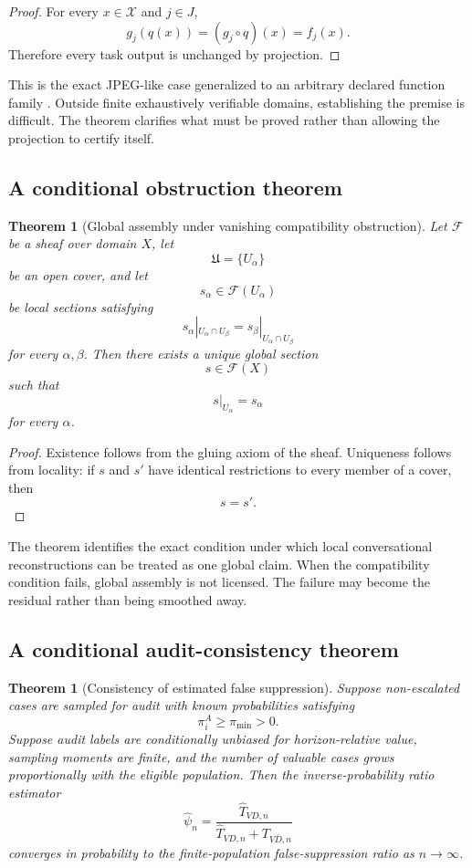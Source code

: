 \documentclass[11pt]{article}
\newtheorem{theorem}[definition]{Theorem}
\theoremstyle{definition}
\begin{document}
\begin{proof}
For every \(x\in\mathcal{X}\) and \(j\in J\),
\[
g_j(q(x))
=
(g_j\circ q)(x)
=
f_j(x).
\]
Therefore every task output is unchanged by projection.
\end{proof}

This is the exact JPEG-like case generalized to an arbitrary declared function family \cite{mitchell2002}. Outside finite exhaustively verifiable domains, establishing the premise is difficult. The theorem clarifies what must be proved rather than allowing the projection to certify itself.

\subsection{A conditional obstruction theorem}

\begin{theorem}[Global assembly under vanishing compatibility obstruction]
Let \(\mathcal{F}\) be a sheaf over domain \(X\), let
\[
\mathfrak{U}=\{U_\alpha\}
\]
be an open cover, and let
\[
s_\alpha\in\mathcal{F}(U_\alpha)
\]
be local sections satisfying
\[
s_\alpha|_{U_\alpha\cap U_\beta}
=
s_\beta|_{U_\alpha\cap U_\beta}
\]
for every \(\alpha,\beta\). Then there exists a unique global section
\[
s\in\mathcal{F}(X)
\]
such that
\[
s|_{U_\alpha}=s_\alpha
\]
for every \(\alpha\).
\end{theorem}

\begin{proof}
Existence follows from the gluing axiom of the sheaf. Uniqueness follows from locality: if \(s\) and \(s'\) have identical restrictions to every member of a cover, then
\[
s=s'.
\]
\end{proof}

The theorem identifies the exact condition under which local conversational reconstructions can be treated as one global claim. When the compatibility condition fails, global assembly is not licensed. The failure may become the residual rather than being smoothed away.

\subsection{A conditional audit-consistency theorem}

\begin{theorem}[Consistency of estimated false suppression]
Suppose non-escalated cases are sampled for audit with known probabilities satisfying
\[
\pi_i^{A}\geq\pi_{\min}>0.
\]
Suppose audit labels are conditionally unbiased for horizon-relative value, sampling moments are finite, and the number of valuable cases grows proportionally with the eligible population. Then the inverse-probability ratio estimator
\[
\widehat\psi_n
=
\frac{
\widehat T_{VD,n}
}{
\widehat T_{VD,n}+T_{V\bar D,n}
}
\]
converges in probability to the finite-population false-suppression ratio as \(n\to\infty\).
\end{theorem}
\end{document}
